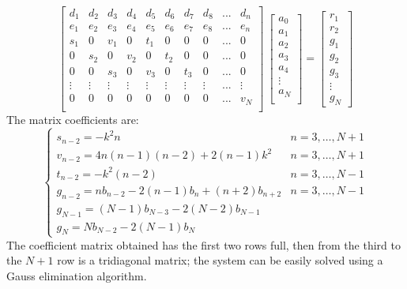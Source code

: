 \[
\begin{bmatrix}
d_1 &d_2 &d_3&d_4&d_5& d_6&d_7& d_8&... &d_n\\
e_1 &e_2&e_3& e_4&e_5& e_6&e_7&e_8&... &e_n\\
s_1&0 &v_1& 0 & t_1& 0 & 0&0&... &0\\
0 & s_2 & 0 & v_2 & 0 & t_2& 0&0&... &0\\
0&0 & s_3 & 0 & v_3 & 0 & t_3& 0&... &0\\
\vdots&\vdots&\vdots&\vdots&\vdots&\vdots&\vdots&\vdots&...&\vdots\\
0&0&0&0&0&0&0&0&...&v_N\\
\end{bmatrix}\
\begin{bmatrix}
a_0\\
a_1\\
a_2\\
a_3\\
a_4\\
\vdots\\
a_N\\
\end{bmatrix}
=
\begin{bmatrix}
r_1\\
r_2\\
g_1\\
g_2\\
g_3\\
\vdots\\
g_N
\end{bmatrix}
\]
The matrix coefficients are:
\[
\begin{cases}
s_{n-2}=-k^2n & n=3,\dots,N+1\\
v_{n-2}=4n(n-1)(n-2)+2(n-1)k^2 &n=3,\dots,N+1\\
t_{n-2}=-k^2(n-2) & n=3,\dots,N-1\\
g_{n-2}=n b_{n-2}-2(n-1)b_n+(n+2)b_{n+2} &n=3,\dots,N-1\\
g_{N-1}=(N-1)b_{N-3}-2(N-2)b_{N-1}\\
g_{N}=Nb_{N-2}-2(N-1)b_N
\end{cases}
\]
The coefficient matrix obtained has the first two rows full, then from the third to the $N+1$ row is a tridiagonal matrix; the system can be easily solved using a Gauss elimination algorithm.

